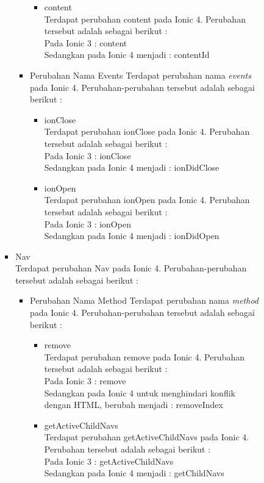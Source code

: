 \begin{enumerate}
\begin{enumerate}
\begin{itemize}
\begin{itemize}
\begin{itemize}
\begin{itemize}
							\item content \\
							Terdapat perubahan content pada Ionic 4. Perubahan tersebut adalah sebagai berikut : \\
							Pada Ionic 3 : content \\
							Sedangkan pada Ionic 4 menjadi : contentId
						\end{itemize}	
					

					\item Perubahan Nama Events
					Terdapat perubahan nama {\it events} pada Ionic 4. Perubahan-perubahan tersebut adalah sebagai berikut :
						\begin{itemize}
							\item ionClose \\
							Terdapat perubahan ionClose pada Ionic 4. Perubahan tersebut adalah sebagai berikut : \\
							Pada Ionic 3 : ionClose \\
							Sedangkan pada Ionic 4 menjadi : ionDidClose

							\item ionOpen \\
							Terdapat perubahan ionOpen pada Ionic 4. Perubahan tersebut adalah sebagai berikut : \\
							Pada Ionic 3 : ionOpen \\
							Sedangkan pada Ionic 4 menjadi : ionDidOpen
						\end{itemize}	
				\end{itemize}

				\item Nav \\
				Terdapat perubahan Nav pada Ionic 4. Perubahan-perubahan tersebut adalah sebagai berikut :
				\begin{itemize}
					\item Perubahan Nama Method 
					Terdapat perubahan nama {\it method} pada Ionic 4. Perubahan-perubahan tersebut adalah sebagai berikut :
					\begin{itemize}
						\item remove \\
						Terdapat perubahan remove pada Ionic 4. Perubahan tersebut adalah sebagai berikut :\\
						Pada Ionic 3 : remove \\
						Sedangkan pada Ionic 4 untuk menghindari konflik dengan HTML, berubah menjadi : removeIndex 

						\item getActiveChildNavs \\
						Terdapat perubahan getActiveChildNavs pada Ionic 4. Perubahan tersebut adalah sebagai berikut :\\
						Pada Ionic 3 : getActiveChildNavs \\
						Sedangkan pada Ionic 4 menjadi : getChildNavs
					\end{itemize}


\end{itemize}
\end{itemize}
\end{itemize}
\end{enumerate}
\end{enumerate}
